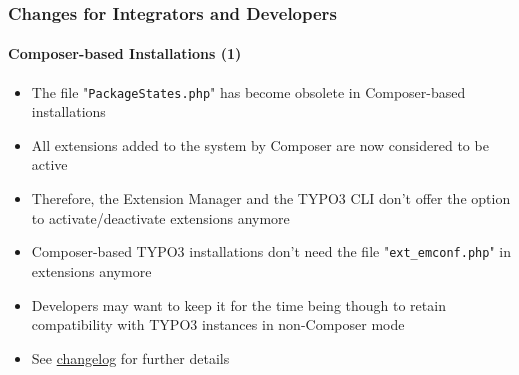 %

\begin{frame}[fragile]
	\frametitle{Changes for Integrators and Developers}
	\framesubtitle{Composer-based Installations (1)}


	\begin{itemize}
		\item The file "\texttt{PackageStates.php}" has become obsolete in
			Composer-based installations
		\item All extensions added to the system by Composer are now considered
			to be active
		\item Therefore, the Extension Manager and the TYPO3 CLI don't offer the
			option to activate/deactivate extensions anymore
		\item Composer-based TYPO3 installations don't need the file
			"\texttt{ext\_emconf.php}" in extensions anymore
		\item Developers may want to keep it for the time being though to retain
			compatibility with TYPO3 instances in non-Composer mode
		\item See
			\href{https://docs.typo3.org/c/typo3/cms-core/master/en-us/Changelog/11.4/Feature-94996-ConsiderAllComposerInstalledExtensionsAsActive.html}{changelog}
			for further details
	\end{itemize}
\end{frame}

